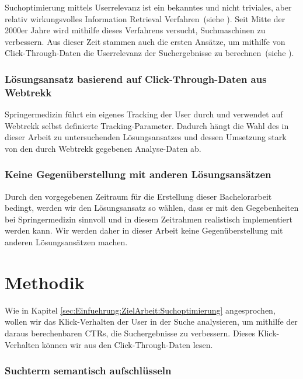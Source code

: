 Suchoptimierung mittels Userrelevanz ist ein bekanntes und nicht triviales, aber relativ wirkungsvolles Information Retrieval Verfahren~(siehe \cite{IWUSBI}). Seit Mitte der 2000er Jahre wird mithilfe dieses Verfahrens versucht, Suchmaschinen zu verbessern. Aus dieser Zeit stammen auch die ersten Ansätze, um mithilfe von Click-Through-Daten die Userrelevanz der Suchergebnisse zu berechnen~(siehe \cite{Joachims}).

\subsubsection{Lösungsansatz basierend auf Click-Through-Daten aus Webtrekk}
\label{sec:Einfuehrung:ZielArbeit:AbbildungSpringermedizinUmfeld:Loesungsansatz}

Springermedizin führt ein eigenes Tracking der User durch und verwendet auf Webtrekk selbst definierte Tracking-Parameter. Dadurch hängt die Wahl des in dieser Arbeit zu untersuchenden Lösungsansatzes und dessen Umsetzung stark von den durch Webtrekk gegebenen Analyse-Daten ab.

\subsubsection{Keine Gegenüberstellung mit anderen Lösungsansätzen}
\label{sec:Einfuehrung:ZielArbeit:AbbildungSpringermedizinUmfeld:NichtBehandeln}

Durch den vorgegebenen Zeitraum für die Erstellung dieser Bachelorarbeit bedingt, werden wir den Lösungsansatz so wählen, dass er mit den Gegebenheiten bei Springermedizin sinnvoll und in diesem Zeitrahmen realistisch implementiert werden kann. Wir werden daher in dieser Arbeit keine Gegenüberstellung mit anderen Lösungsansätzen machen. 


\section{Methodik}
\label{sec:Einfuehrung:Methodik}

Wie in Kapitel \ref{sec:Einfuehrung:ZielArbeit:Suchoptimierung} angesprochen, wollen wir das Klick-Verhalten der User in der Suche analysieren, um mithilfe der daraus berechenbaren CTRs, die Suchergebnisse zu verbessern. Dieses Klick-Verhalten können wir aus den Click-Through-Daten lesen. 

\subsubsection{Suchterm semantisch aufschlüsseln}
\label{sec:Einfuehrung:Methodik:SuchtermSegmentierung}

